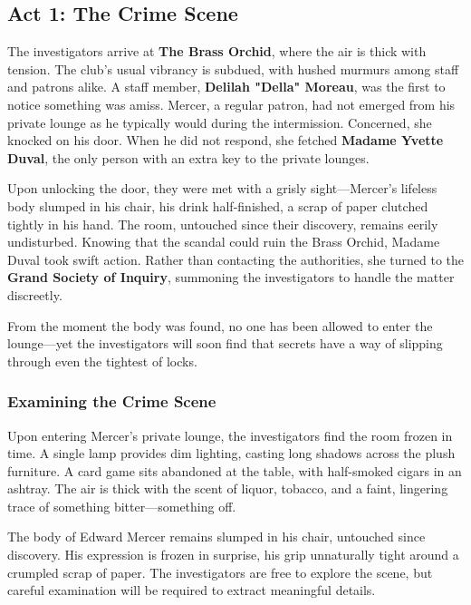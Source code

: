 \subsection{Act 1: The Crime Scene}


The investigators arrive at \textbf{The Brass Orchid}, where the air is thick with tension. The club’s usual vibrancy is subdued, with hushed murmurs among staff and patrons alike. A staff member, \textbf{Delilah "Della" Moreau}, was the first to notice something was amiss. Mercer, a regular patron, had not emerged from his private lounge as he typically would during the intermission. Concerned, she knocked on his door. When he did not respond, she fetched \textbf{Madame Yvette Duval}, the only person with an extra key to the private lounges. 

Upon unlocking the door, they were met with a grisly sight—Mercer’s lifeless body slumped in his chair, his drink half-finished, a scrap of paper clutched tightly in his hand. The room, untouched since their discovery, remains eerily undisturbed. Knowing that the scandal could ruin the Brass Orchid, Madame Duval took swift action. Rather than contacting the authorities, she turned to the \textbf{Grand Society of Inquiry}, summoning the investigators to handle the matter discreetly.

From the moment the body was found, no one has been allowed to enter the lounge—yet the investigators will soon find that secrets have a way of slipping through even the tightest of locks.


\subsubsection{Examining the Crime Scene}

Upon entering Mercer's private lounge, the investigators find the room frozen in time. A single lamp provides dim lighting, casting long shadows across the plush furniture. A card game sits abandoned at the table, with half-smoked cigars in an ashtray. The air is thick with the scent of liquor, tobacco, and a faint, lingering trace of something bitter—something off.

The body of Edward Mercer remains slumped in his chair, untouched since discovery. His expression is frozen in surprise, his grip unnaturally tight around a crumpled scrap of paper. The investigators are free to explore the scene, but careful examination will be required to extract meaningful details.


